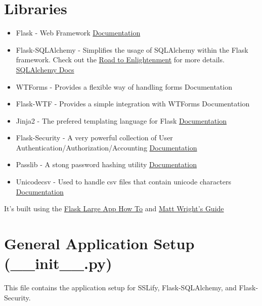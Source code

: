 \documentclass[letterpaper,10pt,english]{sphinxmanual}
\begin{document}
\section{Libraries}
\label{dev-overview:libraries}\begin{itemize}
\item {} 
Flask - Web Framework \href{http://flask.pocoo.org/}{Documentation}

\item {} 
Flask-SQLAlchemy - Simplifies the usage of SQLAlchemy within the Flask framework.
Check out the \href{http://packages.python.org/Flask-SQLAlchemy/quickstart.html\#road-to-enlightenment}{Road to Enlightenment}
for more details.  \href{http://docs.sqlalchemy.org/en/rel\_0\_8/}{SQLAlchemy Docs}

\item {} 
WTForms - Provides a flexible way of handling forms Documentation

\item {} 
Flask-WTF - Provides a simple integration with WTForms Documentation

\item {} 
Jinja2 - The prefered templating language for Flask \href{http://jinja.pocoo.org/docs/}{Documentation}

\item {} 
Flask-Security - A very powerful collection of User Authentication/Authorization/Accounting
\href{http://flask-security.readthedocs.org/en/latest/index.html}{Documentation}

\item {} 
Passlib - A stong password hashing utility \href{http://packages.python.org/passlib/new\_app\_quickstart.html\#pbkdf2}{Documentation}

\item {} 
Unicodecsv - Used to handle csv files that contain unicode characters \href{https://github.com/jdunck/python-unicodecsv}{Documentation}

\end{itemize}

It's built using the \href{https://github.com/mitsuhiko/flask/wiki/Large-app-how-to)}{Flask Large App How To} and \href{http://mattupstate.com/python/2013/06/26/how-i-structure-my-flask-applications.html?utm\_medium=referral\&utm\_source=pulsenews\#s2c}{Matt Wright's Guide}


\section{General Application Setup (\_\_init\_\_.py)}
\label{dev-overview:module-cagenix}\label{dev-overview:general-application-setup-init-py}
This file contains the application setup for
SSLify, Flask-SQLAlchemy, and Flask-Security.
\end{document}
